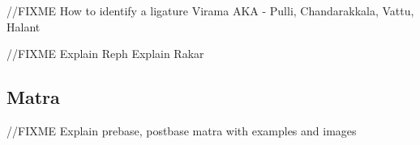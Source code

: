 //FIXME
How to identify a ligature Virama
AKA - Pulli, Chandarakkala, Vattu, Halant



//FIXME
Explain Reph
Explain Rakar

\subsection*{Matra}
//FIXME
Explain prebase, postbase matra with examples and images






